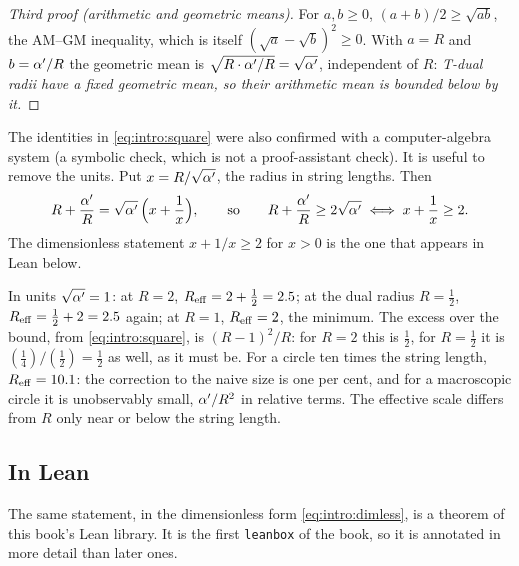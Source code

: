 \begin{proof}[Third proof (arithmetic and geometric means)]
For $a,b\ge0$, $(a+b)/2\ge\sqrt{ab}$, the AM--GM inequality, which is
itself $(\sqrt a-\sqrt b)^2\ge0$. With $a=R$ and $b=\alpha'/R$ the geometric mean is
$\sqrt{R\cdot\alpha'/R}=\sqrt{\alpha'}$, independent of $R$: \emph{T-dual radii have a fixed geometric
mean, so their arithmetic mean is bounded below by it.}
\end{proof}

The identities in \eqref{eq:intro:square} were also confirmed with a computer-algebra
system (a symbolic check, which is not a proof-assistant check). It is useful to remove the
units. Put $x=R/\sqrt{\alpha'}$, the radius in string lengths. Then
\begin{equation}\label{eq:intro:dimless}
  R+\frac{\alpha'}{R}=\sqrt{\alpha'}\,\Big(x+\frac1x\Big),\qquad\text{so}\qquad
  R+\frac{\alpha'}{R}\ge2\sqrt{\alpha'}\iff x+\frac1x\ge2 .
\end{equation}
The dimensionless statement $x+1/x\ge2$ for $x>0$ is the one that appears in Lean below.

\begin{example}[Numbers]\label{ex:intro:numbers}
In units $\sqrt{\alpha'}=1$: at $R=2$, $R_{\rm eff}=2+\tfrac12=2.5$; at the dual radius
$R=\tfrac12$, $R_{\rm eff}=\tfrac12+2=2.5$ again; at $R=1$, $R_{\rm eff}=2$, the minimum. The
excess over the bound, from \eqref{eq:intro:square}, is $(R-1)^2/R$: for $R=2$ this is
$\tfrac12$, for $R=\tfrac12$ it is $(\tfrac14)/(\tfrac12)=\tfrac12$ as well, as it must be. For a
circle ten times the string length, $R_{\rm eff}=10.1$: the correction to the naive size is
one per cent, and for a macroscopic circle it is unobservably small, $\alpha'/R^2$ in relative
terms. The effective scale differs from $R$ only near or below the string length.
\end{example}

\subsection{In Lean}

The same statement, in the dimensionless form \eqref{eq:intro:dimless}, is a theorem of this
book's Lean library. It is the first \texttt{leanbox} of the book, so it is annotated in more
detail than later ones.


